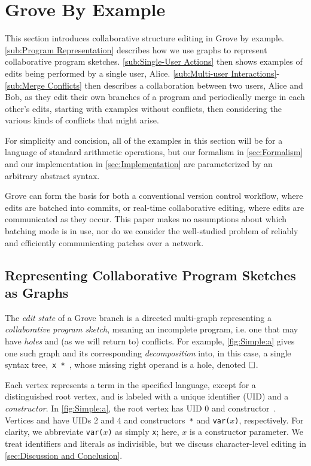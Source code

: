 
\section{Grove By Example}%
\label{sec:Grove By Example}

This section introduces collaborative structure editing in Grove by example.
\autoref{sub:Program Representation} describes how we use graphs to represent collaborative program sketches. 
\autoref{sub:Single-User Actions} then shows examples of edits being performed by a single user, Alice. 
\autoref{sub:Multi-user Interactions}-\ref{sub:Merge Conflicts} then describes a collaboration between two users, Alice and Bob,
as they edit their own branches of a program and periodically merge in each other's edits, starting with examples without conflicts, then considering the various kinds of conflicts that might arise.

For simplicity and concision, all of the examples in this section will be for a 
language of standard arithmetic operations, 
but our formalism in \autoref{sec:Formalism} and our implementation in \autoref{sec:Implementation} are parameterized by an arbitrary abstract syntax.

\figureSimple


Grove can form the basis for both a conventional version control workflow,
where edits are batched into commits, or real-time collaborative editing, 
where edits are communicated as they occur. This paper makes no assumptions about which batching mode is in use, nor do we consider the well-studied problem of reliably and efficiently communicating patches over a network.

\subsection{Representing Collaborative Program Sketches as Graphs}%
\label{sub:Program Representation}

The \textit{edit state} of a Grove branch is a directed multi-graph representing a \emph{collaborative program sketch}, meaning an incomplete program, i.e. one that may have \emph{holes} and (as we will return to) conflicts. 
For example, \autoref{fig:Simple:a} gives one such graph and its corresponding \emph{decomposition} into, in this case, a single syntax tree,~\texttt{x * \hole},
whose missing right operand is a hole, denoted $\square$.

Each vertex represents a term in the specified language, except for a distinguished root vertex, 
and is labeled with a unique identifier (UID) and a \emph{constructor}. 
In \autoref{fig:Simple:a}, the root vertex has UID 0 and constructor~\textbullet. 
Vertices \vSimpleTimes{} and \vSimpleX{} have UIDs 2 and 4 and constructors~\texttt{*} and \texttt{var(}$x$\texttt{)}, respectively.
For clarity, we abbreviate \texttt{var(}$x$\texttt{)} as simply \texttt{x}; here, $x$ is a constructor parameter. We treat identifiers and literals as indivisible, but we discuss character-level editing in \autoref{sec:Discussion and Conclusion}.

